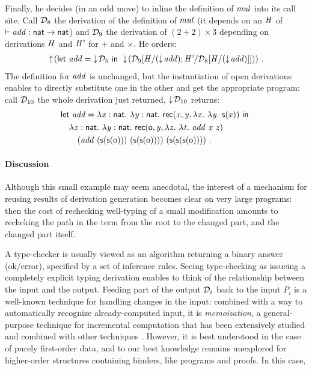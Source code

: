 \documentclass[9pt]{sigplanconf}
\begin{document}
Finally, he decides (in an odd move) to inline the definition of
$\text{\textit{mul}}$ into its call site. Call $\mathcal D_8$ the derivation of the
definition of $\text{\textit{mul}}$ (it depends on an $\text{\textit{H}}$ of
$\vdash\text{\textit{add}}:\text{\textsf{nat}}\to\text{\textsf{nat}}$) and $\mathcal D_9$ the derivation of
$(2+2)\times 3$ depending on derivations $\text{\textit{H}}$ and $\text{\textit{H'}}$ for $+$ and
$\times$. He orders:
\begin{align*}
\uparrow\!{}(
\mathsf{let}\ {\text{\textit{add}}}={\downarrow\!{\mathcal D_5}}\ \mathsf{in}\ 
\downarrow\!{({{\mathcal D_9}[{{\text{\textit{H}}}/{(\downarrow\!{\text{\textit{add}}})}; {\text{\textit{H'}}}/{{\mathcal D_8}[{{\text{\textit{H}}}/{(\downarrow\!{\text{\textit{add}}})}}]}}]})}
)
  \ \text{.}
\end{align*}
The definition for $\text{\textit{add}}$ is unchanged, but the instantiation of
open derivations enables to directly substitute one in the other and
get the appropriate program: call $\mathcal D_{10}$ the whole derivation just
returned, $\downarrow\!{\mathcal D_{10}}$ returns:
\begin{align*}
  &\mathsf{let}\ {\text{\textit{add}}}={\lambda{\ensuremath{\text{\textit{x}}}}:{\text{\textsf{nat}}}.\  \lambda{\ensuremath{\text{\textit{y}}}}:{\text{\textsf{nat}}}.\  \text{\textsf{rec}}({\text{\textit{x}}},{\text{\textit{y}}},{\lambda{\ensuremath{\text{\textit{x}}}}.\  \lambda{\ensuremath{\text{\textit{y}}}}.\  \text{\textsf{s}} ({\text{\textit{x}}})})}\ \mathsf{in}\ 
  \\&\quad
  {\lambda{\ensuremath{\text{\textit{x}}}}:{\ensuremath{\text{\textsf{nat}}}}.\ \lambda{\ensuremath{\text{\textit{y}}}}:{\ensuremath{\text{\textsf{nat}}}}.\ \ensuremath{\text{\textsf{rec}}}({\ensuremath{\text{\textsf{o}}}},{\ensuremath{\text{\textit{y}}}},{\lambda{\ensuremath{\text{\textit{z}}}}.\ \lambda{\ensuremath{\text{\textit{t}}}}.\ {\ensuremath{\text{\textit{add}}}}\ {\ensuremath{\text{\textit{x}}}}\  {\ensuremath{\text{\textit{z}}}}})}
  \\&\quad\quad
  {({\ensuremath{\text{\textit{add}}}}\  {(\ensuremath{\text{\textsf{s}}} ({\ensuremath{\text{\textsf{s}}} ({\ensuremath{\text{\textsf{o}}}})}))}\ 
    {(\ensuremath{\text{\textsf{s}}} ({\ensuremath{\text{\textsf{s}}} ({\ensuremath{\text{\textsf{o}}}})}))})}\ {(\text{\textsf{s}} ({\text{\textsf{s}} ({\text{\textsf{s}} ({\text{\textsf{o}}})})}))}
  \ \text{.}
\end{align*}

\paragraph{Discussion}

Although this small example may seem anecdotal, the interest of a
mechanism for reusing results of derivation generation becomes clear
on very large programs: then the cost of rechecking well-typing of a
small modification amounts to recheking the path in the term from the
root to the changed part, and the changed part itself.

A type-checker is usually viewed as an algorithm returning a binary
answer (ok/error), specified by a set of inference rules. Seeing
type-checking as issueing a completely explicit typing derivation
enables to think of the relationship between the input and the
output. Feeding part of the output $\mathcal D_i$ back to the input $P_i$ is
a well-known technique for handling changes in the input: combined
with a way to automatically recognize already-computed input, it is
\emph{memoization}, a general-purpose technique for incremental
computation that has been extensively studied and combined with other
techniques \cite{pugh1989incremental, acar2003selective}. However, it
is best understood in the case of purely first-order data, and to our
best knowledge remains unexplored for higher-order structures
containing binders, like programs and proofs. In this case,
\end{document}
